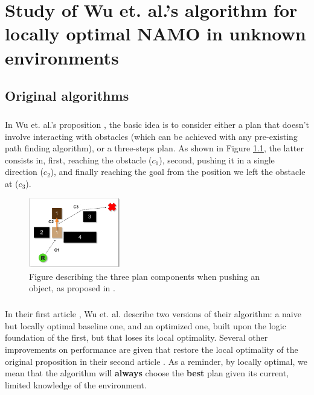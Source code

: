 
\chapter{Study of Wu et. al.'s algorithm for locally optimal NAMO in unknown environments} %

\label{Chapter3} %

\section{Original algorithms}\label{original_algo_section}

\paragraph{} In Wu et. al.'s proposition \parencite{wu_navigation_2010}, the basic idea is to consider either a plan that doesn't involve interacting with obstacles (which can be achieved with any pre-existing path finding algorithm), or a three-steps plan. As shown in Figure \ref{fig:Wu_Original_Algorithm-wu_components_illus}, the latter consists in, first, reaching the obstacle ($c_{1}$), second, pushing it in a single direction ($c_{2}$), and finally reaching the goal from the position we left the obstacle at ($c_{3}$).

\begin{figure}[H]
\centering
\includegraphics[width=4cm]{Figures/Wu_Original_Algorithm/wu_components_illus.png}
\caption{Figure describing the three plan components when pushing an object, as proposed in \parencite{wu_navigation_2010}.}
\label{fig:Wu_Original_Algorithm-wu_components_illus}
\end{figure}

\paragraph{} In their first article \parencite{wu_navigation_2010}, Wu et. al. describe two versions of their algorithm: a naive but locally optimal baseline one, and an optimized one, built upon the logic foundation of the first, but that loses its local optimality. Several other improvements on performance are given that restore the local optimality of the original proposition in their second article \parencite{levihn_locally_2014}. As a reminder, by locally optimal, we mean that the algorithm will \textbf{always} choose the \textbf{best} plan given its current, limited knowledge of the environment.


